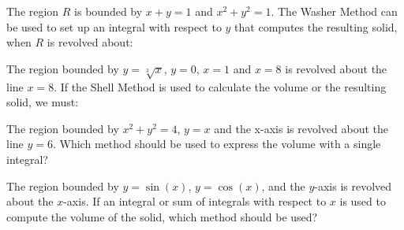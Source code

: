 \documentclass{ximera}
\author{Jim Talamo}
\begin{document}
\begin{exercise}
 The region $R$ is bounded by $x+y=1$ and $x^2+y^2=1$.  The Washer Method can be used to set up an integral with respect to $y$ that computes the resulting solid, when $R$ is revolved about:
 
 
\begin{multipleChoice}
\end{multipleChoice}

\end{exercise}

\begin{exercise}
 The region bounded by $y=\sqrt[3]{x}$, $y=0$, $x=1$ and $x=8$ is revolved about the line $x=8$.  If the Shell Method is used to calculate the volume or the resulting solid, we must:
 
\begin{multipleChoice}
\end{multipleChoice}

\end{exercise}



\begin{exercise}
 The region bounded by $x^2+y^2=4$, $y=x$ and the x-axis is revolved about the line $y=6$.  Which method should be used to express the volume with a single integral?

 
\begin{multipleChoice}
\end{multipleChoice}

\end{exercise}

\begin{exercise}
 The region bounded by $y=\sin(x)$, $y=\cos(x)$, and the $y$-axis is revolved about the $x$-axis.  If an integral or sum of integrals with respect to $x$ is used to compute the volume of the solid, which method should be used?
 
\begin{multipleChoice}
\end{multipleChoice}

\end{exercise}
\end{document}
